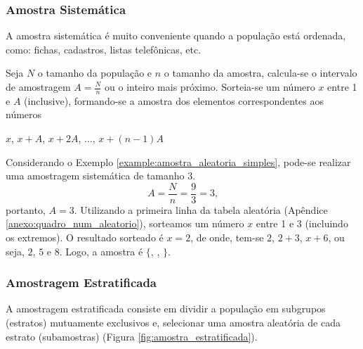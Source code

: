 \documentclass[11pt,fleqn]{book}
\numberwithin{mpicture}{chapter}
\numberwithin{mtable}{chapter}
\numberwithin{mframe}{chapter}
\begin{document}
\subsubsection{Amostra Sistemática}

A amostra sistemática é muito conveniente quando a população está ordenada, como: fichas, cadastros, listas telefônicas, etc.

Seja $N$ o tamanho da população e $n$ o tamanho da amostra, calcula-se o intervalo de amostragem $A=\frac{N}{n}$ ou o inteiro mais próximo. Sorteia-se um número $x$ entre 1 e $A$ (inclusive), formando-se a amostra dos elementos correspondentes aos números
\begin{center}
	$x$, $x+A$, $x+2A$, $\dots$, $x+(n-1)A$
\end{center}

\begin{example}
	Considerando o Exemplo \ref{example:amostra_aleatoria_simples}, pode-se realizar uma amostragem sistemática de tamanho 3.
	\[
		A=\frac{N}{n}=\frac{9}{3}=3\text{,}
	\]
	portanto, $A=3$. Utilizando a primeira linha da tabela aleatória (Apêndice \ref{anexo:quadro_num_aleatorio}), sorteamos um número $x$ entre 1 e 3 (incluindo os extremos). O resultado sorteado é $x=2$, de onde, tem-se $2$, $2+3$, $x+6$, ou seja, $2$, $5$ e $8$. Logo, a amostra é $\{$, , $\}$.
\end{example}

\subsubsection{Amostragem Estratificada}

A amostragem estratificada consiste em dividir a população em subgrupos (estratos) mutuamente exclusivos e, selecionar uma amostra aleatória de cada estrato (subamostras) (Figura \ref{fig:amostra_estratificada}).

\newpage
\end{document}
